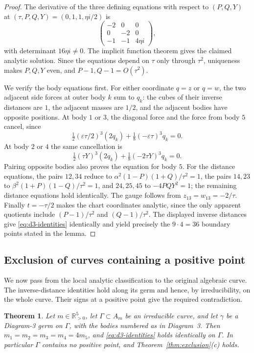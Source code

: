 \documentclass[Threeside,11pt]{article}
\newtheorem{theorem}{Theorem}[section]
\theoremstyle{definition}
\theoremstyle{remark}
\numberwithin{equation}{section}
\theoremstyle{remark}
\newcommand{\Rp}{\mathbb{R}_{>0}}
\begin{document}
{\begin{proof}
The derivative of the three defining equations with respect to $(P,Q,Y)$ at
$(\tau,P,Q,Y)=(0,1,1,\eta i/2)$ is
\[
 \begin{pmatrix}-2&0&0\\0&-2&0\\-1&-1&4\eta i\end{pmatrix},
\]
with determinant $16\eta i\ne0$. The implicit function theorem gives the
claimed analytic solution. Since the equations depend on $\tau$ only through
$\tau^2$, uniqueness makes $P,Q,Y$ even, and $P-1,Q-1=O(\tau^2)$.

We verify the body equations first. For either coordinate $q=z$ or $q=w$,
the two adjacent side forces at outer body $k$ sum to $q_k$:
the cubes of their inverse distances are $1$, the adjacent masses are $1/2$,
and the adjacent bodies have opposite positions.
At body $1$ or $3$, the diagonal force and the force from body $5$ cancel,
since
\[
 \tfrac12(\varepsilon\tau/2)^3(2q_k)
       +\tfrac18(-\varepsilon\tau)^3q_k=0.
\]
At body $2$ or $4$ the same cancellation is
\[
 \tfrac12(\tau Y)^3(2q_k)+\tfrac18(-2\tau Y)^3q_k=0.
\]
Pairing opposite bodies also proves the equation for body $5$.
For the distance equations, the pairs $12,34$ reduce to
$\alpha^2(1-P)(1+Q)/\tau^2=1$, the pairs $14,23$ to
$\beta^2(1+P)(1-Q)/\tau^2=1$, and $24,25,45$ to $-4PQY^2=1$;
the remaining distance equations hold identically. The gauge follows from
$z_{13}=w_{13}=-2/\tau$.
Finally $t=-\tau/2$ makes the chart coordinates analytic, since the only
apparent quotients include $(P-1)/\tau^2$ and $(Q-1)/\tau^2$.
The displayed inverse distances give \eqref{eq:d3-identities} identically
and yield precisely the $9\cdot4=36$ boundary points stated in the lemma.
\end{proof}

}\subsection{Exclusion of curves containing a positive point}

We now pass from the local analytic classification to the original algebraic curve.
The inverse-distance identities hold along its germ and hence, by irreducibility,
on the whole curve. Their signs at a positive point give the required contradiction.

\begin{theorem}\label{thm:d3}
Let $m\in\Rp^5$, let $\Gamma\subset A_m$ be an irreducible curve, and let $\gamma$ be a Diagram-3
germ on $\Gamma$, with the bodies numbered as in Diagram~3.  Then $m_1=m_2=m_3=m_4=4m_5$, and
\eqref{eq:d3-identities} holds identically on $\Gamma$.  In particular $\Gamma$ contains no
positive point, and Theorem~\ref{thm:exclusion}(c) holds.
\end{theorem}
\end{document}
